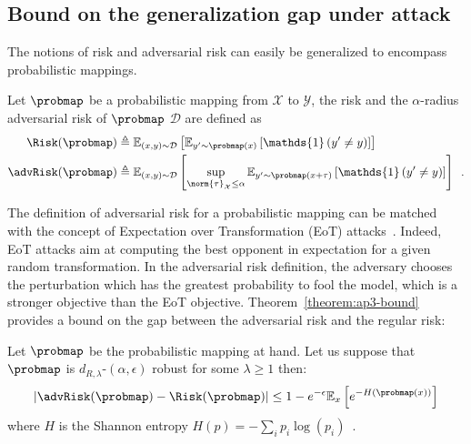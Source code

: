\subsection{Bound on the generalization gap under attack}

The notions of risk and adversarial risk can easily be generalized to encompass probabilistic mappings.

\begin{definition}
  Let $\probmap$ be a probabilistic mapping from $\mathcal{X}$ to $\mathcal{Y}$, the risk and the $\alpha$-radius adversarial risk of $\probmap$ \wrt $\mathcal{D}$ are defined as 
  \begin{align}
    \Risk(\probmap) &\triangleq \mathbb{E}_{(x,y) \sim \mathcal{D}} \left[ \mathbb{E}_{y'\sim \probmap(x)} \left[ \mathds{1} \left( y' \neq y \right)\right]\right] \\
    \advRisk(\probmap) &\triangleq \mathbb{E}_{(x,y)\sim \mathcal{D}}\left[ \sup_{\norm{\tau}_{\mathcal{X}} \leq \alpha}\mathbb{E}_{y'\sim \probmap(x+\tau)} \left[ \mathds{1} \left( y' \neq y \right)\right]\right]\enspace.
  \end{align}
\end{definition}

The definition of adversarial risk for a probabilistic mapping can be matched with the concept of Expectation over Transformation (EoT) attacks~\cite{athalye2018obfuscated}.
Indeed, EoT attacks aim at computing the best opponent in expectation for a given random transformation.
In the adversarial risk definition, the adversary chooses the perturbation which has the greatest probability to fool the model, which is a stronger objective than the EoT objective.
Theorem~\ref{theorem:ap3-bound} provides a bound on the gap between the adversarial risk and the regular risk:

\begin{theorem}
  Let $\probmap$ be the probabilistic mapping at hand.
  Let us suppose that  $\probmap$ is $d_{R,\lambda}$-$(\alpha,\epsilon)$ robust for some $\lambda\geq1$ then:
  \begin{equation}
    |\advRisk(\probmap)-\Risk(\probmap)|\leq 1-e^{-\epsilon}\mathbb{E}_x\left[e^{-H(\probmap(x))}\right]
  \end{equation}
  where $H$ is the Shannon entropy $H(p)=-\sum_i p_i \log(p_i)\enspace.$
\label{theorem:ap3-bound}
\end{theorem}

